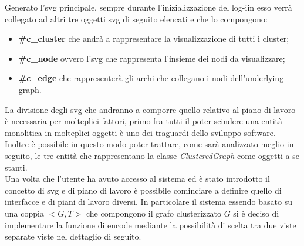 {Generato l'svg principale, sempre durante l'inizializzazione del log-iin esso verrà collegato ad altri tre oggetti svg di seguito elencati e che lo compongono:
\begin{itemize}
	\item \textbf{\#c\_cluster} che andrà a rappresentare la visualizzazione di tutti i cluster; 
	\item \textbf{\#c\_node} ovvero l'svg che rappresenta l'insieme dei nodi da visualizzare;
	\item \textbf{\#c\_edge} che rappresenterà gli archi che collegano i nodi dell'underlying graph.
\end{itemize}
La divisione degli svg che andranno a comporre quello relativo al piano di lavoro è necessaria per molteplici fattori, primo fra tutti il poter scindere una entità monolitica in molteplici oggetti è uno dei traguardi dello sviluppo software. Inoltre è possibile in questo modo poter trattare, come sarà analizzato meglio in seguito, le tre entità che rappresentano la classe \textit{ClusteredGraph} come oggetti a se stanti.\\
Una volta che l'utente ha avuto accesso al sistema ed è stato introdotto il concetto di svg e di piano di lavoro è possibile cominciare a definire quello di interfacce e di piani di lavoro diversi.
In particolare il sistema essendo basato su una coppia $<G,T>$ che compongono il grafo clusterizzato $G$ si è deciso di implementare la funzione di encode mediante la possibilità di scelta tra due viste separate viste nel dettaglio di seguito.
}

